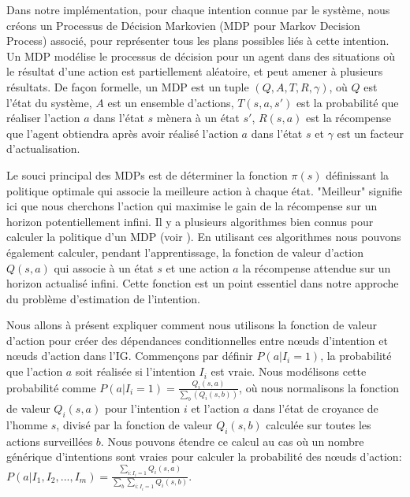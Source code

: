 \documentclass[a4paper,11pt,twoside]{StyleThese}
\begin{document}
Dans notre implémentation, pour chaque intention connue par le système, nous créons un Processus de Décision Markovien (MDP pour Markov Decision Process) associé, pour représenter tous les plans possibles liés à cette intention. Un MDP modélise le processus de décision pour un agent dans des situations où le résultat d'une action est partiellement aléatoire, et peut amener à plusieurs résultats. De façon formelle, un MDP est un tuple  \((Q,A,T,R,\gamma)\), où $Q$ est l'état du système, $A$ est un ensemble d'actions, $T(s,a,s')$ est la probabilité que réaliser l'action $a$ dans l'état $s$ mènera à un état $s'$, $R(s,a)$ est la récompense que l'agent obtiendra après avoir réalisé l'action $a$ dans l'état $s$ et \(\gamma\) est un facteur d'actualisation.


Le souci principal des MDPs est de déterminer la fonction \(\pi(s)\) définissant la politique optimale qui associe la meilleure action à chaque état. "Meilleur" signifie ici que nous cherchons l'action qui maximise le gain de la récompense sur un horizon potentiellement infini. Il y a plusieurs algorithmes bien connus pour calculer la politique d'un MDP (voir \cite{2012Mausam}). En utilisant ces algorithmes nous pouvons également calculer, pendant l'apprentissage, la fonction de valeur d'action \(Q(s,a)\) qui associe à un état $s$ et une action $a$ la récompense attendue sur un horizon actualisé infini. Cette fonction est un point essentiel dans notre approche du problème d'estimation de l'intention.



Nous allons à présent expliquer comment nous utilisons la fonction de valeur d'action pour créer des dépendances conditionnelles entre nœuds d'intention et nœuds d'action dans l'IG. Commençons par définir \(P(a|I_i=1)\), la probabilité que l'action $a$ soit réalisée si l'intention $I_i$ est vraie. Nous modélisons cette probabilité comme \(P(a|I_i=1)=\frac{Q_i(s,a)}{\sum_b(Q_i(s,b))}\), où nous normalisons la fonction de valeur $Q_i(s,a)$ pour l'intention $i$ et l'action $a$ dans l'état de croyance de l'homme $s$, divisé par la fonction de valeur $Q_i(s,b)$ calculée sur toutes les actions surveillées $b$. Nous pouvons étendre ce calcul au cas où un nombre générique d'intentions sont vraies pour calculer la probabilité des nœuds d'action: \(P(a|I_1,I_2,...,I_m)=\frac{\sum_{i:I_i=1}Q_i(s,a)}{\sum_b\sum_{i:I_i=1}Q_i(s,b)}\).
\end{document}
